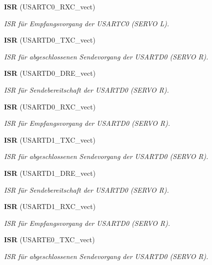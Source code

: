 \begin{DoxyCompactItemize}
{\bf ISR} (USARTC0\_\-RXC\_\-vect)
\begin{DoxyCompactList}\small\item\em ISR für Empfangsvorgang der USARTC0 (SERVO L). \item\end{DoxyCompactList}\item 
{\bf ISR} (USARTD0\_\-TXC\_\-vect)
\begin{DoxyCompactList}\small\item\em ISR für abgeschlossenen Sendevorgang der USARTD0 (SERVO R). \item\end{DoxyCompactList}\item 
{\bf ISR} (USARTD0\_\-DRE\_\-vect)
\begin{DoxyCompactList}\small\item\em ISR für Sendebereitschaft der USARTD0 (SERVO R). \item\end{DoxyCompactList}\item 
{\bf ISR} (USARTD0\_\-RXC\_\-vect)
\begin{DoxyCompactList}\small\item\em ISR für Empfangsvorgang der USARTD0 (SERVO R). \item\end{DoxyCompactList}\item 
{\bf ISR} (USARTD1\_\-TXC\_\-vect)
\begin{DoxyCompactList}\small\item\em ISR für abgeschlossenen Sendevorgang der USARTD0 (SERVO R). \item\end{DoxyCompactList}\item 
{\bf ISR} (USARTD1\_\-DRE\_\-vect)
\begin{DoxyCompactList}\small\item\em ISR für Sendebereitschaft der USARTD0 (SERVO R). \item\end{DoxyCompactList}\item 
{\bf ISR} (USARTD1\_\-RXC\_\-vect)
\begin{DoxyCompactList}\small\item\em ISR für Empfangsvorgang der USARTD0 (SERVO R). \item\end{DoxyCompactList}\item 
{\bf ISR} (USARTE0\_\-TXC\_\-vect)
\begin{DoxyCompactList}\small\item\em ISR für abgeschlossenen Sendevorgang der USARTD0 (SERVO R). \item\end{DoxyCompactList}\item 

\end{DoxyCompactItemize}
